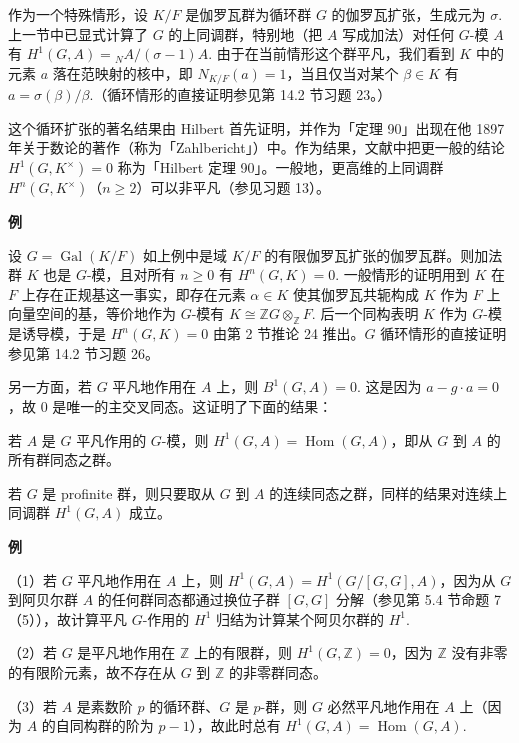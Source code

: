 作为一个特殊情形，设 \(K/F\) 是伽罗瓦群为循环群 \(G\) 的伽罗瓦扩张，生成元为 \(\sigma\). 上一节中已显式计算了 \(G\) 的上同调群，特别地（把 \(A\) 写成加法）对任何 \(G\)-模 \(A\) 有 \(H^1(G, A) = {}_NA/(\sigma-1)A\). 由于在当前情形这个群平凡，我们看到 \(K\) 中的元素 \(a\) 落在范映射的核中，即 \(N_{K/F}(a) = 1\)，当且仅当对某个 \(\beta \in K\) 有 \(a = \sigma(\beta)/\beta\).（循环情形的直接证明参见第 14.2 节习题 23。）

这个循环扩张的著名结果由 Hilbert 首先证明，并作为「定理 90」出现在他 1897 年关于数论的著作（称为「Zahlbericht」）中。作为结果，文献中把更一般的结论 \(H^1(G, K^\times) = 0\) 称为「Hilbert 定理 90」。一般地，更高维的上同调群 \(H^n(G, K^\times)\)（\(n \geq 2\)）可以非平凡（参见习题 13）。

\noindent\textbf{例}

设 \(G = \operatorname{Gal}(K/F)\) 如上例中是域 \(K/F\) 的有限伽罗瓦扩张的伽罗瓦群。则加法群 \(K\) 也是 \(G\)-模，且对所有 \(n \geq 0\) 有 \(H^n(G, K) = 0\). 一般情形的证明用到 \(K\) 在 \(F\) 上存在正规基这一事实，即存在元素 \(\alpha \in K\) 使其伽罗瓦共轭构成 \(K\) 作为 \(F\) 上向量空间的基，等价地作为 \(G\)-模有 \(K \cong \mathbb{Z}G \otimes_{\mathbb{Z}}F\). 后一个同构表明 \(K\) 作为 \(G\)-模是诱导模，于是 \(H^n(G, K) = 0\) 由第 2 节推论 24 推出。\(G\) 循环情形的直接证明参见第 14.2 节习题 26。

另一方面，若 \(G\) 平凡地作用在 \(A\) 上，则 \(B^1(G, A) = 0\). 这是因为 \(a-g \cdot a = 0\)，故 \(0\) 是唯一的主交叉同态。这证明了下面的结果：

\begin{proposition}\label{pro:17.30}
若 \(A\) 是 \(G\) 平凡作用的 \(G\)-模，则 \(H^1(G, A) = \operatorname{Hom}(G, A)\)，即从 \(G\) 到 \(A\) 的所有群同态之群。
\end{proposition}

若 \(G\) 是 profinite 群，则只要取从 \(G\) 到 \(A\) 的连续同态之群，同样的结果对连续上同调群 \(H^1(G, A)\) 成立。

\noindent\textbf{例}

（1）若 \(G\) 平凡地作用在 \(A\) 上，则 \(H^1(G, A) = H^1(G/[G,G], A)\)，因为从 \(G\) 到阿贝尔群 \(A\) 的任何群同态都通过换位子群 \([G,G]\) 分解（参见第 5.4 节命题 7（5）），故计算平凡 \(G\)-作用的 \(H^1\) 归结为计算某个阿贝尔群的 \(H^1\).

（2）若 \(G\) 是平凡地作用在 \(\mathbb{Z}\) 上的有限群，则 \(H^1(G, \mathbb{Z}) = 0\)，因为 \(\mathbb{Z}\) 没有非零的有限阶元素，故不存在从 \(G\) 到 \(\mathbb{Z}\) 的非零群同态。

（3）若 \(A\) 是素数阶 \(p\) 的循环群、\(G\) 是 \(p\)-群，则 \(G\) 必然平凡地作用在 \(A\) 上（因为 \(A\) 的自同构群的阶为 \(p-1\)），故此时总有 \(H^1(G, A) = \operatorname{Hom}(G, A)\).

